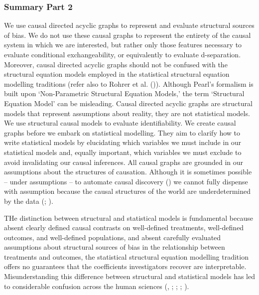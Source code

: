 \documentclass[
  single column]{article}
\begin{document}
\subsubsection{Summary Part 2}\label{summary-part-2}

We use causal directed acyclic graphs to represent and evaluate
structural sources of bias. We do not use these causal graphs to
represent the entirety of the causal system in which we are interested,
but rather only those features necessary to evaluate conditional
exchangeability, or equivalently to evaluate d-separation. Moreover,
causal directed acyclic graphs should not be confused with the
structural equation models employed in the statistical structural
equation modelling traditions (refer also to Rohrer et al.
()). Although Pearl's formalism is
built upon `Non-Parametric Structural Equation Models,' the term
`Structural Equation Model' can be misleading. Causal directed acyclic
graphs are structural models that represent assumptions about reality,
they are not statistical models. We use structural causal models to
evaluate identifiability. We create causal graphs before we embark on
statistical modelling. They aim to clarify how to write statistical
models by elucidating which variables we must include in our statistical
models and, equally important, which variables we must exclude to avoid
invalidating our causal inferences. All causal graphs are grounded in
our assumptions about the structures of causation. Although it is
sometimes possible -- under assumptions -- to automate causal discovery
() we cannot fully
dispense with assumption because the causal structures of the world are
underdetermined by the data (; ).

THe distinction between structural and statistical models is fundamental
because absent clearly defined causal contrasts on well-defined
treatments, well-defined outcomes, and well-defined populations, and
absent carefully evaluated assumptions about structural sources of bias
in the relationship between treatments and outcomes, the statistical
structural equation modelling tradition offers no guarantees that the
coefficients investigators recover are interpretable. Misunderstanding
this difference between structural and statistical models has led to
considerable confusion across the human sciences
(,
;
;
;
).
\end{document}
